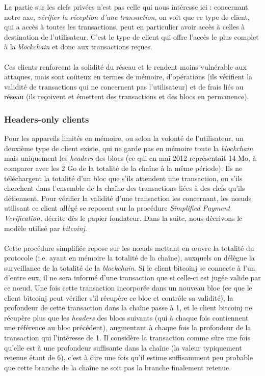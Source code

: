 \documentclass[11pt,a4paper]{article}
\begin{document}
La partie sur les clefs privées n'est pas celle qui nous intéresse ici : concernant notre axe, \textit{vérifier la réception d'une transaction}, on voit que ce type de client, qui a accès à toutes les transactions, peut en particulier avoir accès à celles à destination de l'utilisateur. C'est le type de client qui offre l'accès le plus complet à la \textit{blockchain} et donc aux transactions reçues.\\\\
Ces clients renforcent la solidité du réseau et le rendent moins vulnérable aux attaques, mais sont coûteux en termes de mémoire, d'opérations (ils vérifient la validité de transactions qui ne concernent pas l'utilisateur) et de frais liés au réseau (ils reçoivent et émettent des transactions et des blocs en permanence).
\subsubsection{Headers-only clients}
Pour les appareils limités en mémoire, ou selon la volonté de l'utilisateur, un deuxième type de client existe, qui ne garde pas en mémoire toute la \textit{blockchain} mais uniquement les \textit{headers} des blocs (ce qui en mai 2012 représentait 14 Mo, à comparer avec les 2 Go de la totalité de la chaîne à la même période). Ils ne téléchargent la totalité d'un bloc que s'ils attendent une transaction, ou s'ils cherchent dans l'ensemble de la chaîne des transactions liées à des clefs qu'ils détiennent. Pour vérifier la validité d'une transaction les concernant, les n\oe{}uds utilisant ce client allégé se reposent sur la procédure \textit{Simplified Payment Verification}, décrite dès le papier fondateur. Dans la suite, nous décrivons le modèle utilisé par \textit{bitcoinj}.\\\\
Cette procédure simplifiée repose sur les n\oe{}uds mettant en \oe{}uvre la totalité du protocole (i.e. ayant en mémoire la totalité de la chaîne), auxquels on délègue la surveillance de la totalité de la \textit{blockchain}. Si le client bitcoinj se connecte à l'un d'entre eux, il ne sera informé d'une transaction que si celle-ci est jugée valide par ce n\oe{}ud. Une fois cette transaction incorporée dans un nouveau bloc (ce que le client bitcoinj peut vérifier s'il récupère ce bloc et contrôle sa validité), la profondeur de cette transaction dans la chaîne passe à 1, et le client bitcoinj ne récupère plus que les \textit{headers} des blocs suivants (qui à chaque fois contiennent une référence au bloc précédent), augmentant à chaque fois la profondeur de la transaction qui l'intéresse de 1. Il considère la transaction comme sûre une fois qu'elle est à une profondeur suffisante dans la chaîne (la valeur typiquement retenue étant de 6), c'est à dire une fois qu'il estime suffisamment peu probable que cette branche de la chaîne ne soit pas la branche finalement retenue.\\\\
\end{document}
